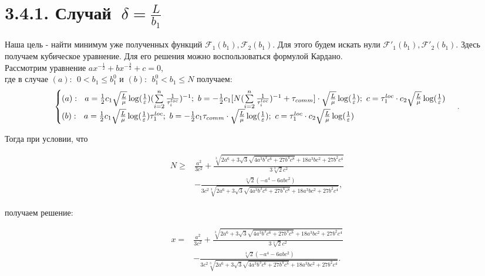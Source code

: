 \documentclass{article}
\theoremstyle{definition}
\theoremstyle{plain}
\begin{document}
\section*{3.4.1. Случай $~\delta = \frac{L}{b_1}$}\label{eq:3.4.1}
Наша цель - найти минимум уже полученных функций $\mathcal{F}_1(b_1), \mathcal{F}_2(b_1)$. Для этого будем искать нули $\mathcal{F'}_1(b_1), \mathcal{F'}_2(b_1)$. Здесь получаем кубическое уравнение.
Для его решения можно воспользоваться формулой Кардано.\\
Рассмотрим уравнение $ax^{-\frac{1}{2}} + bx^{-\frac{3}{2}} + c = 0$,\\
где в случае $(a): ~ ~ 0 < b_1 \leq b_1^0 $ и $(b): ~ ~ b_1^0 <  b_1 \leq N$ получаем:
\begin{eqnarray}
\notag
    \begin{cases}
    (a): ~ ~ a = \frac{1}{2} c_1 \sqrt{\frac{L}{\mu}}\log (\frac{1}{\varepsilon})(\sum\limits_{i = 2}^{n} \frac{1}{\tau_i^{loc}})^{-1}; ~b = -\frac{1}{2} c_1 [N (\sum\limits_{i = 2}^{n} \frac{1}{\tau_i^{loc}})^{-1} + \tau_{comm}]\cdot \sqrt{\frac{L}{\mu}}\log (\frac{1}{\varepsilon}); ~ c = \tau_1^{loc}\cdot c_2  \sqrt{\frac{L}{\mu}}\log (\frac{1} {\varepsilon})
    \\
\notag
    (b): ~ ~ a = \frac{1}{2} c_1  \sqrt{\frac{L}{\mu}}\log (\frac{1}{\varepsilon})\tau_1^{loc}; ~ b = -\frac{1}{2}c_1 \tau_{comm}\cdot \sqrt{\frac{L}{\mu}}\log (\frac{1}{\varepsilon}); ~ c = \tau_1^{loc}\cdot c_2  \sqrt{\frac{L}{\mu}}\log (\frac{1} {\varepsilon})
    \end{cases}\,.
\end{eqnarray}

Тогда при условии, что 

\begin{align*}
    N \geq &\frac{a^2}{3 c^2}+\frac{\sqrt[3]{2 a^6+3 \sqrt{3} \sqrt{4 a^3 b^3 c^6+27 b^4 c^8}+18 a^3 b c^2+27 b^2 c^4}}{3 \sqrt[3]{2} c^2}  \\
    &- \frac{\sqrt[3]{2}\left(-a^4-6 a b c^2\right) } 
    {3 c^2 \sqrt[3]{2 a^6+3 \sqrt{3} \sqrt{4 a^3 b^3 c^6+27 b^4 c^8}+18 a^3 b c^2+27 b^2 c^4}}, 
\end{align*}

получаем решение:

\begin{align*}
     x=&\frac{a^2}{3 c^2}+\frac{\sqrt[3]{2 a^6+3 \sqrt{3} \sqrt{4 a^3 b^3 c^6+27 b^4 c^8}+18 a^3 b c^2+27 b^2 c^4}}{3 \sqrt[3]{2} c^2} \\ &- \frac{\sqrt[3]{2}\left(-a^4-6 a b c^2\right)} 
    {3 c^2 \sqrt[3]{2 a^6+3 \sqrt{3} \sqrt{4 a^3 b^3 c^6+27 b^4 c^8}+18 a^3 b c^2+27 b^2 c^4}}. 
\end{align*}
\end{document}
